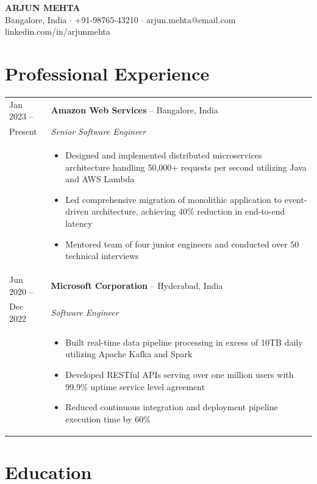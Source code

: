 \documentclass[11pt,letterpaper]{article}
\begin{document}
\begin{center}
{\Large\bfseries ARJUN MEHTA}\\[4pt]
Bangalore, India $\cdot$ +91-98765-43210 $\cdot$ arjun.mehta@email.com\\
linkedin.com/in/arjunmehta
\end{center}

\section{Professional Experience}

\begin{tabular}{@{}p{1.2in}p{5.0in}@{}}
Jan 2023 -- & \textbf{Amazon Web Services} -- Bangalore, India\\
Present & \textit{Senior Software Engineer}\\[2pt]
& \begin{itemize}[leftmargin=*, itemsep=1pt, topsep=0pt, parsep=0pt]
    \item Designed and implemented distributed microservices architecture handling 50,000+ requests per second utilizing Java and AWS Lambda
    \item Led comprehensive migration of monolithic application to event-driven architecture, achieving 40\% reduction in end-to-end latency
    \item Mentored team of four junior engineers and conducted over 50 technical interviews
  \end{itemize}\\[6pt]

Jun 2020 -- & \textbf{Microsoft Corporation} -- Hyderabad, India\\
Dec 2022 & \textit{Software Engineer}\\[2pt]
& \begin{itemize}[leftmargin=*, itemsep=1pt, topsep=0pt, parsep=0pt]
    \item Built real-time data pipeline processing in excess of 10TB daily utilizing Apache Kafka and Spark
    \item Developed RESTful APIs serving over one million users with 99.9\% uptime service level agreement
    \item Reduced continuous integration and deployment pipeline execution time by 60\%
  \end{itemize}
\end{tabular}

\section{Education}
\end{document}
